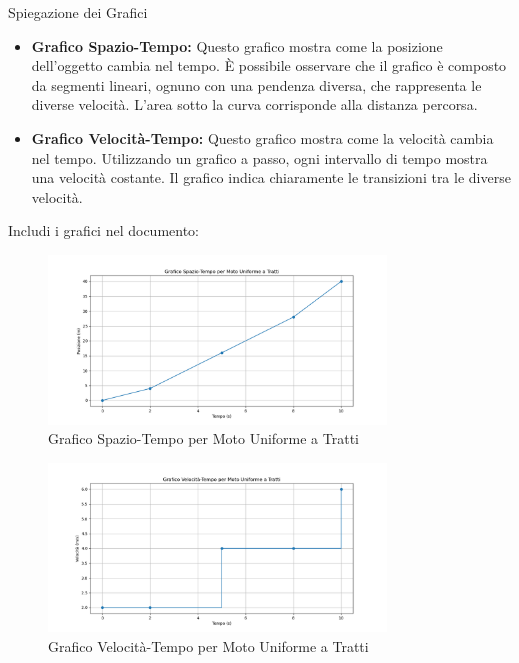 \documentclass[12pt,a4paper,oneside]{book}
\makeatletter
\renewcommand{\subsubsection}{\@startsection {subsubsection}{3}{\z@}
{-2ex \@plus -0.1ex \@minus -.2ex}
{.2ex \@plus.2ex }
{\color[rgb]{0.141,0.596,0.749}\normalfont\small\sffamily\bfseries}}
\theoremstyle{esercizio}
\makeatother
\begin{document}
\subsubsection{Spiegazione dei Grafici}
\begin{itemize}
    \item \textbf{Grafico Spazio-Tempo:} Questo grafico mostra come la posizione dell'oggetto cambia nel tempo. È possibile osservare che il grafico è composto da segmenti lineari, ognuno con una pendenza diversa, che rappresenta le diverse velocità. L'area sotto la curva corrisponde alla distanza percorsa.
    \item \textbf{Grafico Velocità-Tempo:} Questo grafico mostra come la velocità cambia nel tempo. Utilizzando un grafico a passo, ogni intervallo di tempo mostra una velocità costante. Il grafico indica chiaramente le transizioni tra le diverse velocità.
\end{itemize}

Includi i grafici nel documento:
\begin{figure}[h!]
    \centering
    \includegraphics[width=0.8\textwidth]{grafico_spazio_temporale.png}
    \caption{Grafico Spazio-Tempo per Moto Uniforme a Tratti}
    \label{fig:spazio_temporale}
\end{figure}

\begin{figure}[h!]
    \centering
    \includegraphics[width=0.8\textwidth]{grafico_velocita_temporale.png}
    \caption{Grafico Velocità-Tempo per Moto Uniforme a Tratti}
    \label{fig:velocita_temporale}
\end{figure}
\end{document}
